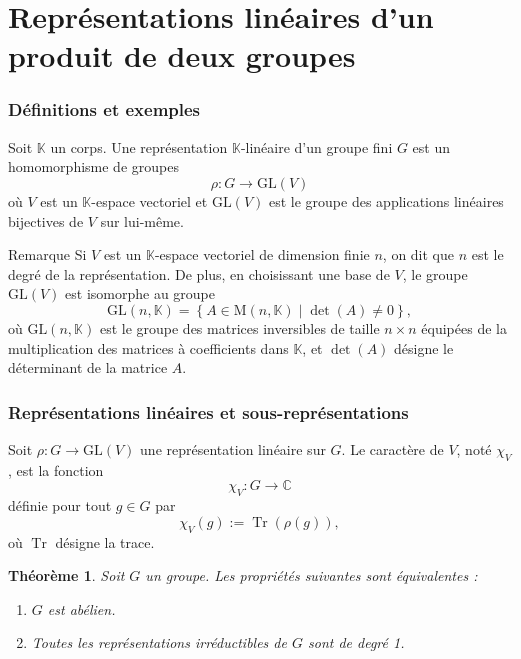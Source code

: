 \documentclass[9pt]{beamer}
\newtheorem{theoreme}{Théorème}
\begin{document}
	\section{Représentations linéaires d'un produit de deux groupes}
	
	\begin{frame}
		\frametitle{Définitions et exemples}
		
		\begin{definition} 
Soit \(\mathbb{K}\) un corps. Une représentation \(\mathbb{K}\)-linéaire d'un groupe fini \(G\) est un homomorphisme de groupes
			\[
			\rho : G \rightarrow \mathrm{GL}(V)
			\]
où \(V\) est un \(\mathbb{K}\)-espace vectoriel et \(\mathrm{GL}(V)\) est le groupe des applications linéaires bijectives de \(V\) sur lui-même.
		\end{definition}

		
		\begin{block}{Remarque} 
Si \(V\) est un \(\mathbb{K}\)-espace vectoriel de dimension finie \(n\), on dit que \(n\) est le degré de la représentation. De plus, en choisissant une base de \(V\), le groupe \(\mathrm{GL}(V)\) est isomorphe au groupe
			\[
			\mathrm{GL}(n, \mathbb{K}) = \left\{ A \in \mathrm{M}(n, \mathbb{K}) \mid \det(A) \neq 0 \right\},
			\]
où \(\mathrm{GL}(n, \mathbb{K})\) est le groupe des matrices inversibles de taille \(n \times n\) équipées de la multiplication des matrices à coefficients dans \(\mathbb{K}\), et \(\det(A)\) désigne le déterminant de la matrice \(A\).
		\end{block}
	\end{frame}
	
	

\begin{frame}
	\frametitle{Représentations linéaires et sous-représentations}
	

	\begin{definition}
	Soit \( \rho : G \to \mathrm{GL}(V) \) une représentation linéaire sur \( G \). Le caractère de \( V \), noté \( \chi_V \), est la fonction
	\[
	\chi_V : G \to \mathbb{C}
	\]
	définie pour tout \( g \in G \) par
	\[
	\chi_V(g) := \operatorname{Tr}(\rho(g)),
	\]
	où \( \operatorname{Tr} \) désigne la trace.
\end{definition}

\begin{theoreme}  
	Soit \( G \) un groupe. Les propriétés suivantes sont équivalentes :
	\begin{enumerate}
		\item[(i)] \( G \) est abélien.
		\item[(ii)] Toutes les représentations irréductibles de \( G \) sont de degré 1.
	\end{enumerate}
\end{theoreme}
	
\end{frame}
\end{document}
